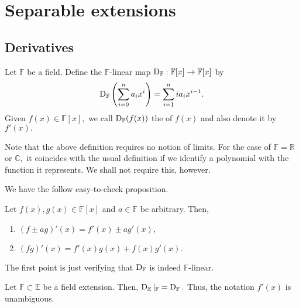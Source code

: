 \chapter{Separable extensions}

\section{Derivatives}

\begin{defn}%
    \label{defn:formalderivative}
    Let $\mathbb{F}$ be a field. Define the $\mathbb{F}$-linear map $\operatorname{D}_{\mathbb{F}} : \mathbb{F}[x] \to \mathbb{F}[x]$ by
    \begin{equation*} 
        \operatorname{D}_{\mathbb{F}}\left(\sum_{i = 0}^{n} a_ix^i\right) = \sum_{i = 1}^{n}ia_i x^{i - 1}.
    \end{equation*}
    Given $f(x) \in \mathbb{F}[x],$ we call $\operatorname{D}_{\mathbb{F}}(f(x))$ the  of $f(x)$ and also denote it by $f'(x).$
\end{defn}

\begin{rem}
    Note that the above definition requires no notion of limits. For the case of $\mathbb{F} = \mathbb{R}$ or $\mathbb{C},$ it coincides with the usual definition if we identify a polynomial with the function it represents. We shall not require this, however.
\end{rem}

We have the follow easy-to-check proposition.
\begin{prop}
    Let $f(x), g(x) \in \mathbb{F}[x]$ and $a \in \mathbb{F}$ be arbitrary. Then,
    \begin{enumerate}
        \item $(f \pm ag)'(x) = f'(x) \pm ag'(x),$
        \item $(fg)'(x) = f'(x)g(x) + f(x)g'(x).$
    \end{enumerate}
\end{prop}
The first point is just verifying that $\operatorname{D}_{\mathbb{F}}$ is indeed $\mathbb{F}$-linear.

\begin{prop}
    Let $\mathbb{F} \subset \mathbb{E}$ be a field extension. Then, $\operatorname{D}_{\mathbb{E}}|_{\mathbb{F}} = \operatorname{D}_{\mathbb{F}}.$ Thus, the notation $f'(x)$ is unambiguous.
\end{prop}

